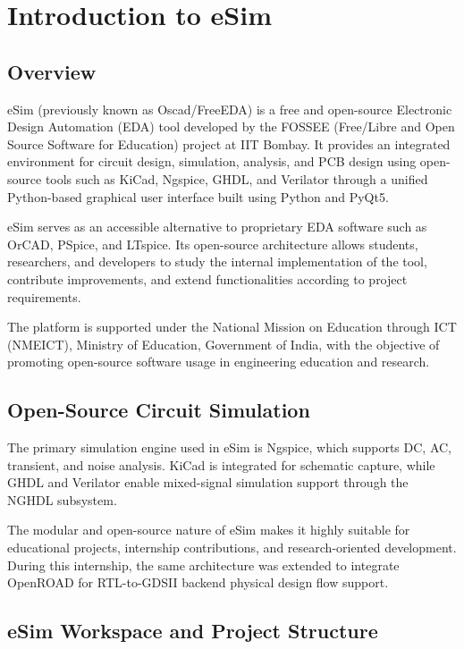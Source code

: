\chapter{Introduction to eSim}

\section{Overview}

eSim (previously known as Oscad/FreeEDA) is a free and open-source Electronic Design Automation (EDA) tool developed by the FOSSEE (Free/Libre and Open Source Software for Education) project at IIT Bombay. It provides an integrated environment for circuit design, simulation, analysis, and PCB design using open-source tools such as KiCad, Ngspice, GHDL, and Verilator through a unified Python-based graphical user interface built using Python and PyQt5.

eSim serves as an accessible alternative to proprietary EDA software such as OrCAD, PSpice, and LTspice. Its open-source architecture allows students, researchers, and developers to study the internal implementation of the tool, contribute improvements, and extend functionalities according to project requirements.

The platform is supported under the National Mission on Education through ICT (NMEICT), Ministry of Education, Government of India, with the objective of promoting open-source software usage in engineering education and research.

\section{Open-Source Circuit Simulation}

The primary simulation engine used in eSim is Ngspice, which supports DC, AC, transient, and noise analysis. KiCad is integrated for schematic capture, while GHDL and Verilator enable mixed-signal simulation support through the NGHDL subsystem.

The modular and open-source nature of eSim makes it highly suitable for educational projects, internship contributions, and research-oriented development. During this internship, the same architecture was extended to integrate OpenROAD for RTL-to-GDSII backend physical design flow support.

\section{eSim Workspace and Project Structure}

